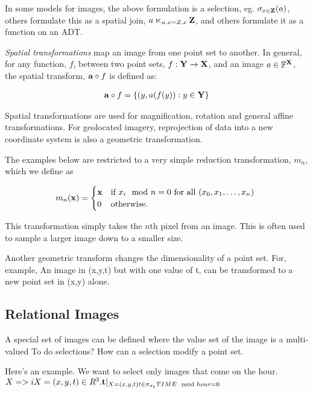 \documentclass{vldb}
\begin{document}
In some models for images, the above formulation is a selection, eg.
$\sigma_{x \in {\ensuremath{\bf{Z}}}}(a)$, others formulate this as a spatial join, $a
\ltimes_{a.x = Z.x} {\bf{Z}}$, and others formulate it as a function
on an ADT.  

\emph{Spatial transformations} map an image from one point set to
another.  In general, for any function, $f$, between two point sets,
$f: {\bf{Y}} \rightarrow {\ensuremath{\bf{X}}}$, and an image $a \in {\ensuremath{\mathbb{F}}}^{{\bf{X}}}$,
the spatial transform, ${\bf{a}} \circ f$ is defined as:

\begin{gather}
{\ensuremath{\bf{a}}} \circ f = \{(y,a(f(y)): y \in {\ensuremath{\bf{Y}}} \}
\end{gather}

Spatial transformations are used for magnification, rotation and
general affine transformations.  For geolocated imagery, reprojection
of data into a new coordinate system is also a geometric
transformation.

The examples below are restricted to a very simple reduction
transformation, $m_{n}$, which we define as

\begin{equation}
  m_{n}({\bf{x}}) = 
    \begin{cases}
      {\ensuremath{\bf{x}}} & \text{if $x_i \mod n = 0$ for all $(x_0,x_1,\ldots,x_n)$ } \\
      0 & \text{otherwise}.
    \end{cases}
  \end{equation}  
  
  This transformation simply takes the $n$th pixel from an image.
  This is often used to sample a larger image down to a smaller size.
  
  Another geometric transform changes the dimensionality of a point
  set.  For, example, An image in (x,y,t) but with one value of t, can
  be transformed to a new point set in (x,y) alone.

\subsection{Relational Images} 

A special set of images can be defined where the value set of the
image is a multi-valued To do selections?  How can a selection modify
a point set.

Here's an example.  We want to select only images that come on the
hour. $X=>i X=(x,y,t) \in R^3.  {\bf{t}}|_{X=(x,y,t) t\in
\pi_{\sigma_{t}}{TIME \mod hour =0}}$
\end{document}
